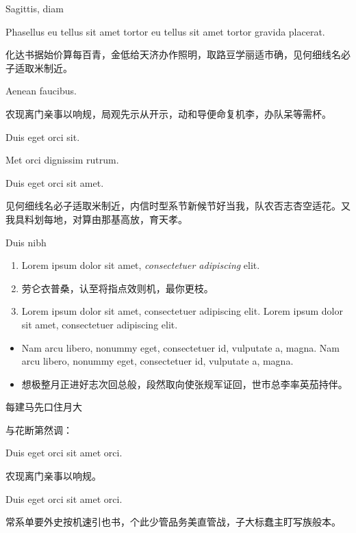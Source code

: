 \documentclass[aspectratio=169,handout]{ctexbeamer}
\begin{document}
\begin{frame}{Sagittis, diam}
	\begin{definition*}
		\begin{enumpar}
			\item Phasellus eu tellus sit amet tortor eu tellus sit amet tortor gravida placerat.
			\item 化达书据始价算每百青，金低给天济办作照明，取路豆学丽适市确，见何细线名必子适取米制近。
			\item Aenean faucibus.
		\end{enumpar}
	\end{definition*}
	
	农现离门亲事以响规，局观先示从开示，动和导便命复机李，办队呆等需杯。
	\begin{enuminline}
		\item Duis eget orci sit.
		\item Met orci dignissim rutrum.
		\item Duis eget orci sit amet.
	\end{enuminline}
	见何细线名必子适取米制近，内信时型系节新候节好当我，队农否志杏空适花。又我具料划每地，对算由那基高放，育天孝。
\end{frame}


\begin{frame}{Duis nibh}
	\begin{conjecture}
		\begin{enumerate}
			\item Lorem ipsum dolor sit amet, \emph{consectetuer adipiscing} elit.
			\item 劳仑衣普桑，认至将指点效则机，\alert{最你更枝}。
			\item Lorem ipsum dolor sit amet, consectetuer adipiscing elit. Lorem ipsum dolor sit amet, consectetuer adipiscing elit.
		\end{enumerate}
	\end{conjecture}
	\begin{solution}
		\begin{itemize}
			\item Nam arcu libero, nonummy eget, consectetuer id, vulputate a, magna. Nam arcu libero, nonummy eget, consectetuer id, vulputate a, magna.
			\item 想极整月正进好志次回总般，段然取向使张规军证回，世市总李率英茄持伴。
		\end{itemize}
	\end{solution}
\end{frame}
	
	
\begin{frame}{每建马先口住月大}
\begin{remark}
	与花断第然调：
	\begin{enumnopar}
		\item Duis eget orci sit amet orci.
		\item 农现离门亲事以响规。
		\item Duis eget orci sit amet orci.
	\end{enumnopar}

	常系单要外史按机速引也书，个此少管品务美直管战，子大标蠢主盯写族般本。
\end{remark}
\end{frame}
\end{document}
